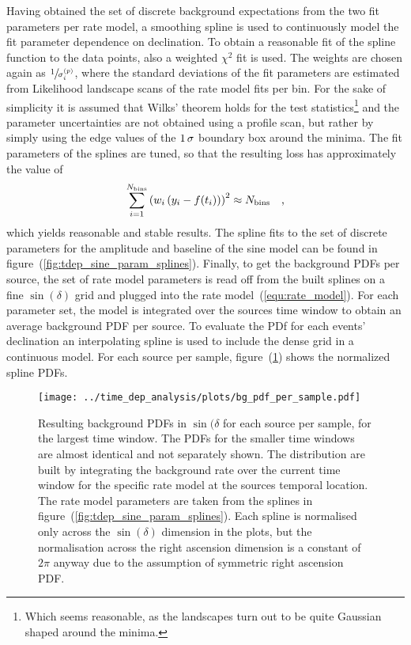 Having obtained the set of discrete background expectations from the two fit parameters per rate model, a smoothing spline is used to continuously model the fit parameter dependence on declination.
To obtain a reasonable fit of the spline function to the data points, also a weighted $\chi^2$ fit is used.
The weights are chosen again as $\sfrac{1}{\sigma_i^{(p)}}$, where the standard deviations of the fit parameters are estimated from Likelihood landscape scans of the rate model fits per bin.
For the sake of simplicity it is assumed that Wilks' theorem holds for the test statistics\footnote{Which seems reasonable, as the landscapes turn out to be quite Gaussian shaped around the minima.} and the parameter uncertainties are not obtained using a profile scan, but rather by simply using the edge values of the $\num{1}\,\sigma$ boundary box around the minima.
The fit parameters of the splines are tuned, so that the resulting loss has approximately the value of
\begin{equation}
  \sum_{i=1}^{N_\text{bins}} \left(w_i\left(y_i - f(t_i)\right)\right)^2
  \approx N_\text{bins}
  \quad\text{,}
\end{equation}
which yields reasonable and stable results.
The spline fits to the set of discrete parameters for the amplitude and baseline of the sine model can be found in figure~(\ref{fig:tdep_sine_param_splines}).
Finally, to get the background PDFs per source, the set of rate model parameters is read off from the built splines on a fine $\sin(\delta)$ grid and plugged into the rate model~(\ref{equ:rate_model}).
For each parameter set, the model is integrated over the sources time window to obtain an average background PDF per source.
To evaluate the PDf for each events' declination an interpolating spline is used to include the dense grid in a continuous model.
For each source per sample, figure~(\ref{fig:tdep_bg_pdf_per_sample}) shows the normalized spline PDFs.

\begin{figure}[htbp]
  \centering
  \texttt{[image: ../time\_dep\_analysis/plots/bg\_pdf\_per\_sample.pdf]}
  \caption[Background PDFs per source per sample for the time-dependent analysis]{
    Resulting background PDFs in $\sin(\delta$ for each source per sample, for the largest time window.
    The PDFs for the smaller time windows are almost identical and not separately shown.
    The distribution are built by integrating the background rate over the current time window for the specific rate model at the sources temporal location.
    The rate model parameters are taken from the splines in figure~(\ref{fig:tdep_sine_param_splines}).
    Each spline is normalised only across the $\sin(\delta)$ dimension in the plots, but the normalisation across the right ascension dimension is a constant of $2\pi$ anyway due to the assumption of symmetric right ascension PDF.
  }
  \label{fig:tdep_bg_pdf_per_sample}
\end{figure}


